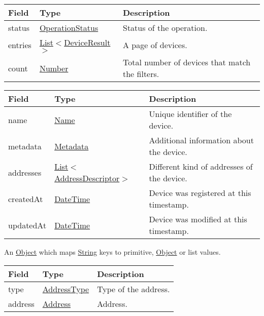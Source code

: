 \documentclass[a4paper]{arrowhead}
\newcommand{\pref}[1]{{\textcolor{ArrowheadGrey}{\hyperref[sec:model:primitives:#1]{#1}}}}
\begin{document}
\clearpage


\begin{table}[ht!]
\begin{tabularx}{\textwidth}{| p{2.5cm} | p{3.1cm} | X |} \hline
\rowcolor{gray!33} Field & Type      & Description \\ \hline
status & \pref{OperationStatus} & Status of the operation. \\ \hline
entries & \pref{List}$<$\hyperref[sec:model:DeviceResult]{DeviceResult}$>$ & A page of devices. \\ \hline
count & \pref{Number} & Total number of devices that match the filters. \\ \hline
\end{tabularx}
\end{table}

 
\begin{table}[ht!]
\begin{tabularx}{\textwidth}{| p{2.5cm} | p{4cm} | X |} \hline
\rowcolor{gray!33} Field & Type      & Description \\ \hline
name & \pref{Name} & Unique identifier of the device. \\ \hline
metadata & \hyperref[sec:model:Metadata]{Metadata} & Additional information about the device. \\ \hline
addresses &  \pref{List}$<$\hyperref[sec:model:AddressDescriptor]{AddressDescriptor}$>$ & Different kind of addresses of the device.  \\ \hline
createdAt & \pref{DateTime} & Device was registered at this timestamp. \\ \hline
updatedAt & \pref{DateTime} & Device was modified at this timestamp. \\ \hline
\end{tabularx}
\end{table}


An \pref{Object} which maps \pref{String} keys to primitive, \pref{Object} or list values.


\begin{table}[ht!]
\begin{tabularx}{\textwidth}{| p{2.5cm} | p{2.5cm} | X |} \hline
\rowcolor{gray!33} Field & Type & Description \\ \hline
type & \pref{AddressType} & Type of the address. \\ \hline
address & \pref{Address} & Address. \\ \hline
\end{tabularx}
\end{table}
\end{document}
